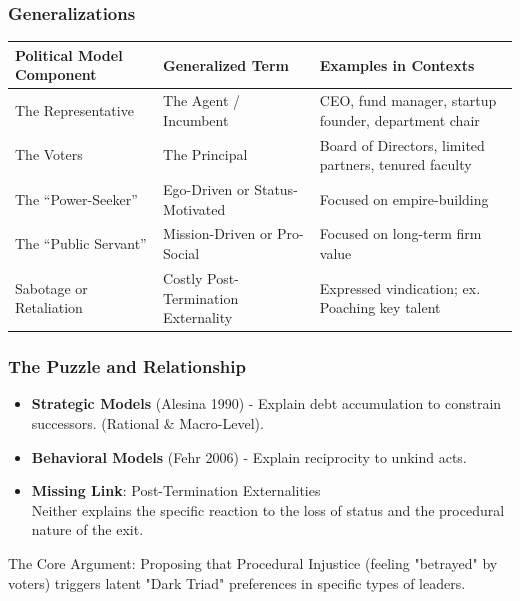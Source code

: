 \documentclass[10pt]{beamer}
\begin{document}
\begin{frame}
  \frametitle{Generalizations}
  \centering 
  \label{tab:generalize}
   \begin{tabularx}{\textwidth}{| L{0.8} | L{1} | L{1.2} |}
    \hline
      \textcolor{UHMGreen}{\textbf{Political Model Component}} & \textcolor{UHMGreen}{\textbf{Generalized Term}} & \textcolor{UHMGreen}{\textbf{Examples in Contexts}} \\
        \hline
        The Representative & The Agent / Incumbent & CEO, fund manager, startup founder, department chair \\
        \hline
        The Voters & The Principal & Board of Directors, limited partners, tenured faculty \\
        \hline
        \textcolor{Lehua}{The ``Power-Seeker''} & Ego-Driven or Status-Motivated & Focused on empire-building \\
        \hline
        \textcolor{Lai}{The ``Public Servant''} & Mission-Driven or Pro-Social & Focused on long-term firm value \\
        \hline
        Sabotage or Retaliation & Costly Post-Termination Externality & Expressed vindication; ex. Poaching key talent \\
        \hline
  \end{tabularx}
\end{frame}

\begin{frame}
    \label{slide:puzzle}
    \frametitle{The Puzzle and Relationship}
    \begin{itemize}
        \item \textcolor{Ocean}{\textbf{Strategic Models}} (Alesina 1990) - Explain debt accumulation to constrain successors. (Rational \& Macro-Level).
        \item \textcolor{Ilima}{\textbf{Behavioral Models}} (Fehr 2006) - Explain reciprocity to unkind acts.
        \item \textcolor{UHMBlack}{\textbf{Missing Link}}: Post-Termination Externalities \\
        Neither explains the specific reaction to the loss of status and the procedural nature of the exit.
    \end{itemize}
    The Core Argument: Proposing that \textcolor{Lehua}{Procedural Injustice} (feeling "betrayed" by voters) triggers latent "Dark Triad" preferences in specific types of leaders. \\
    \hyperlink{slide:dark_triad}{}
\end{frame}
\end{document}
